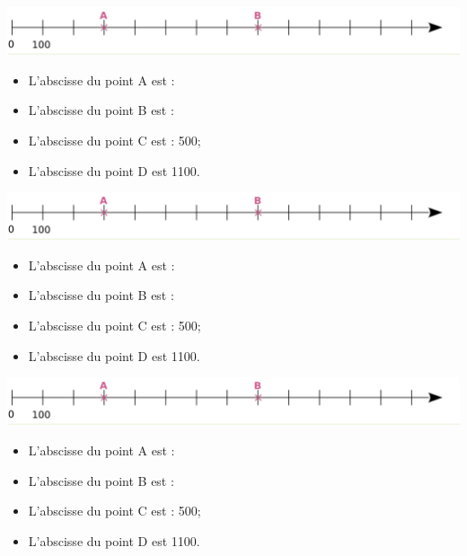 \documentclass[12pt,a4paper]{article}
\begin{document}
\begin{myex}
	\begin{center}
		\includegraphics[scale=0.5]{img/axe}
	\end{center}
	
	\begin{itemize}
		\item L'abscisse du point A est :
		\item L'abscisse du point B est :
		\item L'abscisse du point C est : 500;
		\item L'abscisse du point D est \num{1100}.
	\end{itemize}
\end{myex}

\begin{myex}
	\begin{center}
		\includegraphics[scale=0.5]{img/axe}
	\end{center}
	
	\begin{itemize}
		\item L'abscisse du point A est :
		\item L'abscisse du point B est :
		\item L'abscisse du point C est : 500;
		\item L'abscisse du point D est \num{1100}.
	\end{itemize}
\end{myex}

\begin{myex}
	\begin{center}
		\includegraphics[scale=0.5]{img/axe}
	\end{center}
	
	\begin{itemize}
		\item L'abscisse du point A est :
		\item L'abscisse du point B est :
		\item L'abscisse du point C est : 500;
		\item L'abscisse du point D est \num{1100}.
	\end{itemize}
\end{myex}




	
\end{document}
